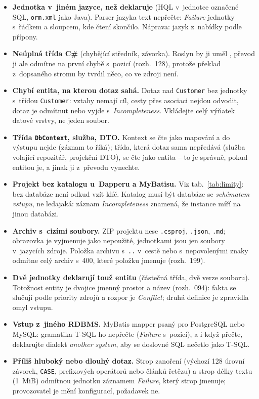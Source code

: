 \documentclass{article}
\begin{document}
\begin{itemize}[leftmargin=*,itemsep=2pt]
\item \textbf{Jednotka v~jiném jazyce, než deklaruje} (HQL v~jednotce označené SQL, \texttt{orm.xml} jako Java). Parser jazyka text nepřečte: \emph{Failure} jednotky s~řádkem a sloupcem, kde čtení skončilo. Náprava: jazyk z~nabídky podle přípony.
\item \textbf{Neúplná třída C\#} (chybějící středník, závorka). Roslyn by ji uměl , převod ji ale odmítne na první chybě s~pozicí (rozh.~128), protože překlad z~dopsaného stromu by tvrdil něco, co ve zdroji není.
\item \textbf{Chybí entita, na kterou dotaz sahá.} Dotaz nad \texttt{Customer} bez jednotky s~třídou \texttt{Customer}: vztahy nemají cíl, cesty přes asociaci nejdou odvodit, dotaz je odmítnut nebo vyjde s~\emph{Incompleteness}. Vkládejte celý výňatek datové vrstvy, ne jeden soubor.
\item \textbf{Třída \texttt{DbContext}, služba, DTO.} Kontext se čte jako mapování a do výstupu nejde (záznam to říká); třída, která dotaz sama nepředává (služba volající repozitář, projekční DTO), se čte jako entita -- to je správně, pokud entitou je, a jinak ji z~převodu vynechte.
\item \textbf{Projekt bez katalogu u~Dapperu a MyBatisu.} Viz tab.~\ref{tab:limity}: bez databáze není odkud vzít klíč. Katalog musí být databáze se \emph{schématem vstupu}, ne ledajaká: záznam \emph{Incompleteness}  znamená, že instance míří na jinou databázi.
\item \textbf{Archiv s~cizími soubory.} ZIP projektu nese \texttt{.csproj}, \texttt{.json}, \texttt{.md}; obrazovka je vyjmenuje jako nepoužité, jednotkami jsou jen soubory v~jazycích zdroje. Položka archivu s~\texttt{..} v~cestě nebo s~nepovolenými znaky odmítne celý archiv s~400, které položku jmenuje (rozh.~199).
\item \textbf{Dvě jednotky deklarují touž entitu} (částečná třída, dvě verze souboru). Totožnost entity je dvojice jmenný prostor a název (rozh.~094): fakta se slučují podle priority zdrojů a rozpor je \emph{Conflict}; druhá definice je zpravidla omyl vstupu.
\item \textbf{Vstup z~jiného RDBMS.} MyBatis mapper psaný pro PostgreSQL nebo MySQL: gramatika T-SQL ho nepřečte (\emph{Failure} s~pozicí), a i když přečte, deklarujte dialekt \emph{another system}, aby se doslovné SQL nečetlo jako T-SQL.
\item \textbf{Příliš hluboký nebo dlouhý dotaz.} Strop zanoření (výchozí 128 úrovní závorek, \texttt{CASE}, prefixových operátorů nebo článků řetězu) a strop délky textu (1~MiB) odmítnou jednotku záznamem \emph{Failure}, který strop jmenuje; provozovatel je mění konfigurací, požadavek ne.
\end{itemize}
\end{document}
